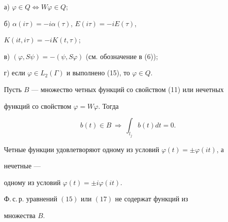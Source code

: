  


а) $\varphi\in Q\Leftrightarrow W\varphi\in Q$; 


 


б) $\alpha(i\tau)=-i\alpha(\tau)$, $E(i\tau)=-iE(\tau)$, 


$K(it,i\tau)=-iK(t,\tau)$; 


 


в) $(\varphi,S\psi)=-(\psi,S\varphi)$ (см. обозначение в (6)); 


 


г) если $\varphi\in L_2(\Gamma)$ и выполнено (15), то $\varphi\in Q$. 


 


Пусть $B$ --- множество четных функций со свойством (11) или нечетных 


функций со свойством $\varphi=W\varphi$. Тогда 


\begin{equation} 


b(t)\in B\ \Rightarrow\ \int_{l_j}b(t)dt=0. 


\end{equation} 


Четные функции удовлетворяют одному из условий $\varphi(t)=\pm\varphi(it)$, а 


нечетные --- 


одному из условий $\varphi(t)=\pm i\varphi(it)$. 


 


 


\begin{lem} 


Ф.\,с.\,р. уравнений $(15)$ или $(17)$ не содержат функций из 


множества $B$. 


\end{lem} 


 


 



